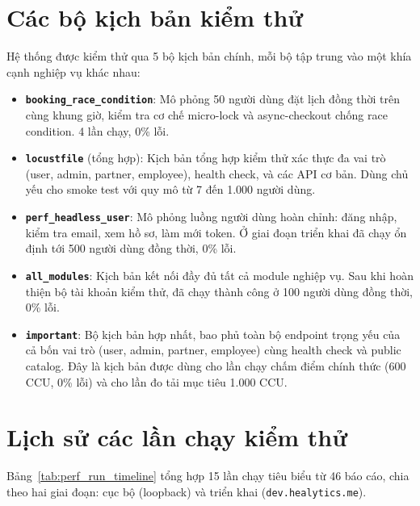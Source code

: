 \section{Các bộ kịch bản kiểm thử}

Hệ thống được kiểm thử qua 5 bộ kịch bản chính, mỗi bộ tập trung vào một khía cạnh nghiệp vụ khác nhau:

\begin{itemize}
    \item \textbf{\texttt{booking\_race\_condition}}: Mô phỏng 50 người dùng đặt lịch đồng thời trên cùng khung giờ, kiểm tra cơ chế micro-lock và async-checkout chống race condition. 4 lần chạy, 0\% lỗi.
    \item \textbf{\texttt{locustfile}} (tổng hợp): Kịch bản tổng hợp kiểm thử xác thực đa vai trò (user, admin, partner, employee), health check, và các API cơ bản. Dùng chủ yếu cho smoke test với quy mô từ 7 đến 1.000 người dùng.
    \item \textbf{\texttt{perf\_headless\_user}}: Mô phỏng luồng người dùng hoàn chỉnh: đăng nhập, kiểm tra email, xem hồ sơ, làm mới token. Ở giai đoạn triển khai đã chạy ổn định tới 500 người dùng đồng thời, 0\% lỗi.
    \item \textbf{\texttt{all\_modules}}: Kịch bản kết nối đầy đủ tất cả module nghiệp vụ. Sau khi hoàn thiện bộ tài khoản kiểm thử, đã chạy thành công ở 100 người dùng đồng thời, 0\% lỗi.
    \item \textbf{\texttt{important}}: Bộ kịch bản hợp nhất, bao phủ toàn bộ endpoint trọng yếu của cả bốn vai trò (user, admin, partner, employee) cùng health check và public catalog. Đây là kịch bản được dùng cho lần chạy chấm điểm chính thức (600 CCU, 0\% lỗi) và cho lần đo tải mục tiêu 1.000 CCU.
\end{itemize}


\section{Lịch sử các lần chạy kiểm thử}

Bảng~\ref{tab:perf_run_timeline} tổng hợp 15 lần chạy tiêu biểu từ 46 báo cáo, chia theo hai giai đoạn: cục bộ (loopback) và triển khai (\texttt{dev.healytics.me}).

